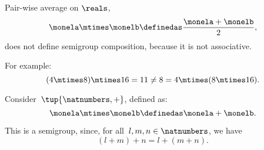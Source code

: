 \begin{example}
    Pair-wise average on $\reals$,
    \begin{equation}
        \label{eq:pairwise}
        \monela \mtimes \monelb \definedas  \frac{\monela + \monelb}{2},
    \end{equation}
    does not define semigroup composition, because it is not associative.
    
    For example:
    \begin{equation}
        \label{eq:pairwise-counterexample}
        (4 \mtimes 8) \mtimes 16 = 11 \neq  8 = 4 \mtimes (8 \mtimes 16).
    \end{equation}
\end{example}



\begin{example}
    \label{exa:natnum-semigroup}
    Consider~$\tup{\natnumbers,+}$, defined as:
    \begin{equation*}
        \label{eq:natnum-semigroup-definition}
        \monela \mtimes \monelb \definedas  \monela + \monelb.
    \end{equation*}
    
    This is a semigroup, since, for all~$l,m, n \in \natnumbers$, we have
    \begin{equation}
    (l+m)
        +n
        =l+(m+n).
    \end{equation}
\end{example}



